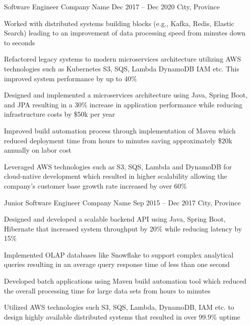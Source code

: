 \documentclass[letterpaper]{resume_config}
\begin{document}
\WorkExperience
    {Software Engineer} %
    {Company Name} %
    {Dec 2017 -- Dec 2020} %
    {City, Province} %
    {} %
    {
        \item Worked with distributed systems building blocks (e.g., Kafka, Redis, Elastic Search) leading to an improvement of data processing speed from minutes down to seconds
        \item Refactored legacy systems to modern microservices architecture utilizing AWS technologies such as Kubernetes S3, SQS, Lambda DynamoDB IAM etc. This improved system performance by up to 40\%
        \item Designed and implemented a microservices architecture using Java, Spring Boot, and JPA resulting in a 30\% increase in application performance while reducing infrastructure costs by \$50k per year
        \item Improved build automation process through implementation of Maven which reduced deployment time from hours to minutes saving approximately \$20k annually on labor cost
        \item Leveraged AWS technologies such as S3, SQS, Lambda and DynamoDB for cloud-native development which resulted in higher scalability allowing the company's customer base growth rate increased by over 60\%
    }

\WorkExperience
    {Junior Software Engineer} %
    {Company Name} %
    {Sep 2015 -- Dec 2017} %
    {City, Province} %
    {} %
    {
        \item Designed and developed a scalable backend API using Java, Spring Boot, Hibernate that increased system throughput by 20\% while reducing latency by 15\%
        \item Implemented OLAP databases like Snowflake to support complex analytical queries resulting in an average query response time of less than one second
        \item Developed batch applications using Maven build automation tool which reduced the overall processing time for large data sets from hours to minutes
        \item Utilized AWS technologies such S3, SQS, Lambda, DynamoDB, IAM etc. to design highly available distributed systems that resulted in over 99.9\% uptime
    }
\end{document}
